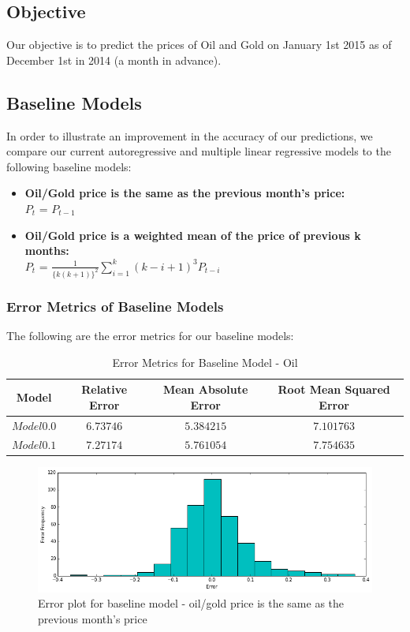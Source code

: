 \documentclass[runningheads]{llncs}
\begin{document}
\subsection{Objective}
Our objective is to predict the prices of Oil and Gold on January 1st 2015 as of December 1st in 2014 (a month in advance).

\subsection{Baseline Models}
In order to illustrate an improvement in the accuracy of our predictions, we compare our current autoregressive and multiple linear regressive models to the following baseline models:

\begin {itemize}
\item \textbf{Oil/Gold price is the same as the previous month's price:} \\
$P_{t}$ = $P_{t-1}$\\
\item \textbf{Oil/Gold price is a weighted mean of the price of previous k months:} \\
$P_{t}$ = $\frac{1}{\{k(k+1)\}^2}\sum\limits_{i=1}^k (k-i+1)^3P_{t-i}$
\end {itemize}

\subsubsection {Error Metrics of Baseline Models} The following are the error metrics for our baseline models: \\

\begin{table}
\begin{center}
\begin{tabular}{|c|c|c|c|}
\hline
Model & Relative Error & Mean Absolute Error & Root Mean Squared Error \\ \hline
$ Model 0.0 $ & $6.73746$ & $5.384215$ & $7.101763$ \\ \hline
$ Model 0.1 $ & $7.27174$ & $5.761054$ & $7.754635$\\ \hline
\end{tabular}
\end{center}
\caption{Error Metrics for Baseline Model - Oil}
\end{table}

\begin{figure}
\centering
\includegraphics[width=\textwidth]{baseline1_error_histogram.png}
\caption{Error plot for baseline model - oil/gold price is the same as the previous month's price}
\label{fig:baseline1_error_histogram.png}
\end{figure}
\end{document}
